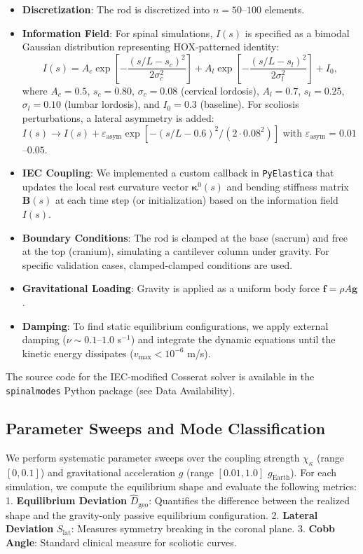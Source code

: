 \begin{itemize}
    \item \textbf{Discretization}: The rod is discretized into $n=50$--$100$ elements.
    \item \textbf{Information Field}: For spinal simulations, $I(s)$ is specified as a bimodal Gaussian distribution representing HOX-patterned identity:
    \begin{equation}
    I(s) = A_c \exp\left[-\frac{(s/L - s_c)^2}{2\sigma_c^2}\right] + A_l \exp\left[-\frac{(s/L - s_l)^2}{2\sigma_l^2}\right] + I_0,
    \label{eq:info_field_spinal}
    \end{equation}
    where $A_c = 0.5$, $s_c = 0.80$, $\sigma_c = 0.08$ (cervical lordosis), $A_l = 0.7$, $s_l = 0.25$, $\sigma_l = 0.10$ (lumbar lordosis), and $I_0 = 0.3$ (baseline). For scoliosis perturbations, a lateral asymmetry is added: $I(s) \to I(s) + \varepsilon_{\mathrm{asym}} \exp[-(s/L - 0.6)^2/(2 \cdot 0.08^2)]$ with $\varepsilon_{\mathrm{asym}} = 0.01$--$0.05$.
    \item \textbf{IEC Coupling}: We implemented a custom callback in \texttt{PyElastica} that updates the local rest curvature vector $\bm{\kappa}^0(s)$ and bending stiffness matrix $\mathbf{B}(s)$ at each time step (or initialization) based on the information field $I(s)$.
    \item \textbf{Boundary Conditions}: The rod is clamped at the base (sacrum) and free at the top (cranium), simulating a cantilever column under gravity. For specific validation cases, clamped-clamped conditions are used.
    \item \textbf{Gravitational Loading}: Gravity is applied as a uniform body force $\mathbf{f} = \rho A \mathbf{g}$.
    \item \textbf{Damping}: To find static equilibrium configurations, we apply external damping ($\nu \sim 0.1$--$1.0$ s$^{-1}$) and integrate the dynamic equations until the kinetic energy dissipates ($v_{\max} < 10^{-6}$ m/s).
\end{itemize}

The source code for the IEC-modified Cosserat solver is available in the \texttt{spinalmodes} Python package (see Data Availability).

\subsection{Parameter Sweeps and Mode Classification}

We perform systematic parameter sweeps over the coupling strength $\chi_\kappa$ (range $[0, 0.1]$) and gravitational acceleration $g$ (range $[0.01, 1.0]$ $g_{\mathrm{Earth}}$). For each simulation, we compute the equilibrium shape and evaluate the following metrics:
1.  \textbf{Equilibrium Deviation} $\widehat{D}_{\mathrm{geo}}$: Quantifies the difference between the realized shape and the gravity-only passive equilibrium configuration.
2.  \textbf{Lateral Deviation} $S_{\mathrm{lat}}$: Measures symmetry breaking in the coronal plane.
3.  \textbf{Cobb Angle}: Standard clinical measure for scoliotic curves.

